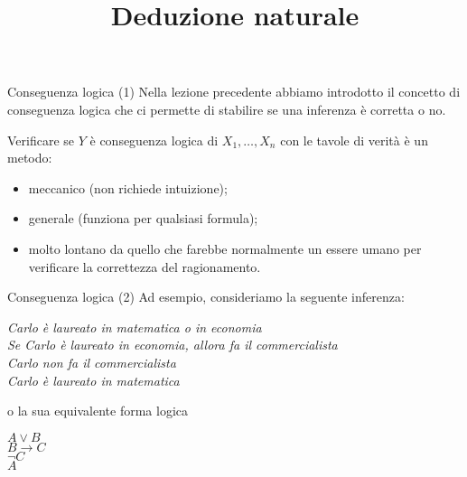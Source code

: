 \documentclass[aspectratio=169,10pt,dvipsnames,xcolor=table,handout]{beamer}
\title{Deduzione naturale}
\begin{document}
\begin{frame}
    \titlepage
\end{frame}

\begin{frame}{Conseguenza logica (1)}
    Nella lezione precedente abbiamo introdotto  il concetto di \alert{conseguenza logica} che ci permette di stabilire se una inferenza è corretta o no.


    \medskip
    Verificare se $Y$ è conseguenza logica di $X_1, \ldots, X_n$ con le tavole di verità è un metodo:
    \begin{itemize}
        \item meccanico (non richiede intuizione);
        \item generale (funziona per qualsiasi formula);
        \item molto lontano da quello che farebbe normalmente un essere umano per verificare la correttezza del ragionamento.
    \end{itemize}
\end{frame}

\begin{frame}{Conseguenza logica (2)}
    Ad esempio, consideriamo la seguente inferenza:
    \begin{center}
        \begin{inference}
            \textit{Carlo è laureato in matematica o in economia}\\
            \textit{Se Carlo è laureato in economia, allora fa il commercialista}\\
            \textit{Carlo non fa il commercialista}\\
            \hline
            \textit{Carlo è laureato in matematica}
        \end{inference}
    \end{center}
    o la sua equivalente forma logica
    \begin{center}
        \begin{inference}
            $A \vee B$\\
            $B \to C$\\
            $\neg C$\\
            \hline
            $A$
        \end{inference}
    \end{center}
\end{frame}
\end{document}
